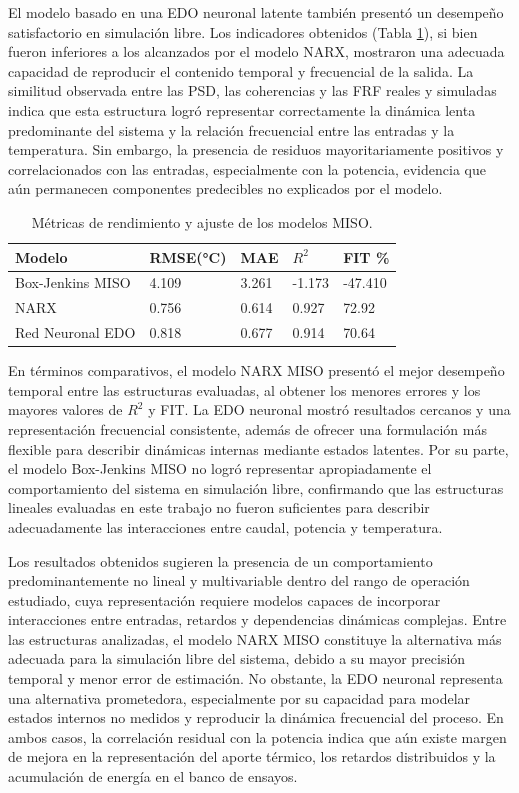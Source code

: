 \documentclass[11pt]{report}
\begin{document}
El modelo basado en una EDO neuronal latente también presentó un desempeño satisfactorio en simulación libre. Los indicadores obtenidos (Tabla \ref{tab:metricas_modelosMISO}), si bien fueron inferiores a los alcanzados por el modelo NARX, mostraron una adecuada capacidad de reproducir el contenido temporal y frecuencial de la salida.  La similitud observada entre las PSD, las coherencias y las FRF reales y simuladas indica que esta estructura logró representar correctamente la dinámica lenta predominante del sistema y la relación frecuencial entre las entradas y la temperatura. Sin embargo, la presencia de residuos mayoritariamente positivos y correlacionados con las entradas, especialmente con la potencia, evidencia que aún permanecen componentes predecibles no explicados por el modelo.

\begin{table}[H]
\centering
\caption{Métricas de rendimiento y ajuste de los modelos MISO.}
\label{tab:metricas_modelosMISO}
\begin{tabular}{|l|l|l|l|l|}
\hline
Modelo           & RMSE(°C) & MAE   & $R^2$ & FIT \%       \\ \hline
Box-Jenkins MISO & 4.109    & 3.261 & -1.173             & -47.410 \\ \hline
NARX             & 0.756    & 0.614 & 0.927                & 72.92   \\ \hline
Red Neuronal EDO & 0.818    & 0.677 & 0.914                & 70.64   \\ \hline
\end{tabular}
\end{table}

En términos comparativos, el modelo NARX MISO presentó el mejor desempeño temporal entre las estructuras evaluadas, al obtener los menores errores y los mayores valores de $R^2$ y FIT. La EDO neuronal mostró resultados cercanos y una representación frecuencial consistente, además de ofrecer una formulación más flexible para describir dinámicas internas mediante estados latentes. Por su parte, el modelo Box-Jenkins MISO no logró representar apropiadamente el comportamiento del sistema en simulación libre, confirmando que las estructuras lineales evaluadas en este trabajo no fueron suficientes para describir adecuadamente las interacciones entre caudal, potencia y temperatura.

Los resultados obtenidos sugieren la presencia de un comportamiento predominantemente no lineal y multivariable dentro del rango de operación estudiado, cuya representación requiere modelos capaces de incorporar interacciones entre entradas, retardos y dependencias dinámicas complejas. Entre las estructuras analizadas, el modelo NARX MISO constituye la alternativa más adecuada para la simulación libre del sistema, debido a su mayor precisión temporal y menor error de estimación. No obstante, la EDO neuronal representa una alternativa prometedora, especialmente por su capacidad para modelar estados internos no medidos y reproducir la dinámica frecuencial del proceso. En ambos casos, la correlación residual con la potencia indica que aún existe margen de mejora en la representación del aporte térmico, los retardos distribuidos y la acumulación de energía en el banco de ensayos.
\end{document}
